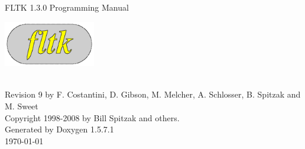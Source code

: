 \documentclass[a4paper]{book}
\begin{document}
\begin{titlepage}
\vspace*{6cm}
\begin{center}
{\Huge FLTK 1.3.0 Programming Manual}\\
\vspace*{0.5cm}
\begin{ImageNoCaption}
 \mbox{\includegraphics[width=4cm]{FL200}}
\end{ImageNoCaption}\\
\vspace*{0.5cm}
{\Large
Revision 9 by F. Costantini, D. Gibson, M. Melcher,
A. Schlosser, B. Spitzak and M. Sweet}\\
\vspace*{0.5cm}
{\large Copyright 1998-2008 by Bill Spitzak and others.}\\
\vspace*{3.5cm}
{\large Generated by Doxygen 1.5.7.1}\\
\vspace*{0.5cm}
\today{}\\
\end{center}
\end{titlepage}
\clearemptydoublepage
{}
\tableofcontents
\clearemptydoublepage
{}
\end{document}
